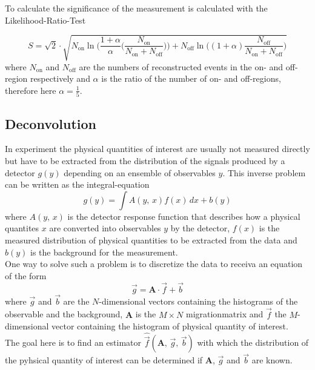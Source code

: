 To calculate the significance of the measurement is calculated with the Likelihood-Ratio-Test 

\begin{equation}
    S = \sqrt{2} \cdot \sqrt{N_\text{on} \ln \biggl( \frac{1+ \alpha}{\alpha} \biggl( \frac{N_\text{on}}{N_\text{on} + N_\text{off}} \biggr) \biggr) 
    + N_\text{off} \ln \biggl( (1+\alpha) \frac{N_\text{off}}{N_\text{on} + N_\text{off} } \biggr) }
\end{equation}
where $N_\text{on}$ and $N_\text{off}$ are the numbers of reconstructed events in the on- and off-region respectively and $\alpha$ is the ratio of the number of 
on- and off-regions, therefore here $\alpha = \frac{1}{5}$.


\subsection{Deconvolution}

In experiment the physical quantities of interest are usually not measured directly but have to be extracted from the distribution of the signals 
produced by a detector $g(y)$ depending on an ensemble of observables $y$. 
This inverse problem can be written as the integral-equation 
\begin{equation}
    g(y) = \int A(y, \, x) f(x) \, dx + b(y)
\end{equation}
where $A(y, \, x)$ is the detector response function that describes how a physical quantites $x$ are converted into observables $y$ by the detector, $f(x)$ 
is the measured distribution of physical quantities to be extracted from the data and $b(y)$ is the background for the measurement. \\
One way to solve such a problem is to discretize the data to receiva an equation of the form 
\begin{equation}
    \vec{g} = \textbf{A} \cdot \vec {f} + \vec{b}
    \label{eq:disc_inv}
\end{equation}
where $\vec{g}$ and $\vec {b}$ are the $N$-dimensional vectors containing the histograms of the observable and the background, $\textbf{A}$ is the 
$M\times N$ migrationmatrix and $\vec{f}$ the $M$-dimensional vector containing the histogram of physical quantity of interest. \\
The goal here is to find an estimator $\hat{\vec{f}}(\textbf{A}, \, \vec{g}, \, \vec{b})$ with which the distribution of the pyhsical quantity of interest 
can be determined if $\textbf{A}$, $\vec{g}$ and $\vec{b}$ are known.

